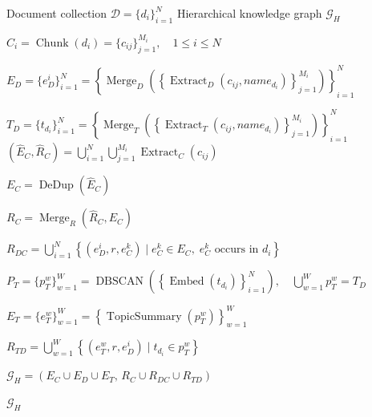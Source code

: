 \begin{algorithm}[H]
\caption{Hierarchical Knowledge Graph Construction}
\label{algo:hkg-construction}
\small
\begin{algorithmic}[1]

\Require Document collection $\mathcal{D}=\{d_i\}_{i=1}^{N}$
\Ensure Hierarchical knowledge graph $\mathcal{G}_{H}$

\State
$C_i
=
\operatorname{Chunk}(d_i)
=
\{c_{ij}\}_{j=1}^{M_i},
\quad 1\leq i\leq N$

\State
$E_D
=
\{e_D^i\}_{i=1}^{N}
=
\left\{
\operatorname{Merge}_{D}
\left(
\left\{
\operatorname{Extract}_{D}(c_{ij},name_{d_i})
\right\}_{j=1}^{M_i}
\right)
\right\}_{i=1}^{N}$

\State
$T_D
=
\{t_{d_i}\}_{i=1}^{N}
=
\left\{
\operatorname{Merge}_{T}
\left(
\left\{
\operatorname{Extract}_{T}(c_{ij},name_{d_i})
\right\}_{j=1}^{M_i}
\right)
\right\}_{i=1}^{N}$
\State
$(\hat{E}_C,\hat{R}_C)
=
\bigcup_{i=1}^{N}
\bigcup_{j=1}^{M_i}
\operatorname{Extract}_{C}(c_{ij})$

\State
$E_C
=
\operatorname{DeDup}(\hat{E}_C)$

\State
$R_C
=
\operatorname{Merge}_{R}
(\hat{R}_C,E_C)$

\State
$R_{DC}
=
\bigcup_{i=1}^{N}
\left\{
(e_D^i,r,e_C^k)
\mid
e_C^k\in E_C,\;
e_C^k\text{ occurs in }d_i
\right\}$

\State
$P_T
=
\{p_T^w\}_{w=1}^{W}
=
\operatorname{DBSCAN}
\left(
\left\{
\operatorname{Embed}(t_{d_i})
\right\}_{i=1}^{N}
\right),
\quad
\bigcup_{w=1}^{W}p_T^w
=
T_D$

\State
$E_T
=
\{e_T^w\}_{w=1}^{W}
=
\left\{
\operatorname{TopicSummary}(p_T^w)
\right\}_{w=1}^{W}$

\State
$R_{TD}
=
\bigcup_{w=1}^{W}
\left\{
(e_T^w,r,e_D^i)
\mid
t_{d_i}\in p_T^w
\right\}$

\State
$\mathcal{G}_{H}
=
\left(
E_C\cup E_D\cup E_T,\,
R_C\cup R_{DC}\cup R_{TD}
\right)$

\State \Return $\mathcal{G}_{H}$

\end{algorithmic}
\end{algorithm}